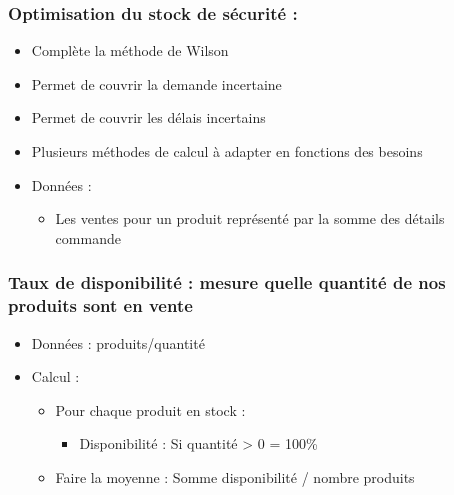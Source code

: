 \subsubsection{Optimisation du stock de sécurité :}  

\begin{itemize}
	\item Complète la méthode de Wilson 

	\item Permet de couvrir la demande incertaine 

	\item Permet de couvrir les délais incertains 

	\item Plusieurs méthodes de calcul à adapter en fonctions des besoins 
\end{itemize}

\begin{itemize}
	\item Données :
	
	\begin{itemize}
		\item Les ventes pour un produit représenté par la somme des détails commande 
	\end{itemize}
		  
\end{itemize}


\subsubsection{Taux de disponibilité : mesure quelle quantité de nos produits sont en vente} 

\begin{itemize}

	\item Données :  produits/quantité  

	\item Calcul :
	
		\begin{itemize}
			\item Pour chaque produit en stock : 
			
				\begin{itemize}
					\item Disponibilité : Si quantité > 0 = 100\% 				
				\end{itemize}
				
			\item Faire la moyenne : Somme disponibilité / nombre produits 	
		\end{itemize}	  

\end{itemize} 

